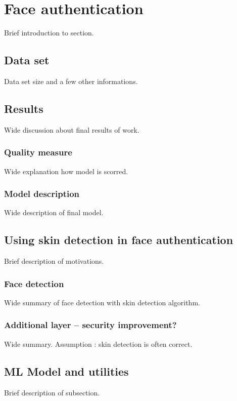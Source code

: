 \section{Face authentication}
    Brief introduction to section.

    \subsection{Data set}
        Data set size and a few other informations.

    \subsection{Results}
        Wide discussion about final results of work.

        \subsubsection*{Quality measure}   %
            Wide explanation how model is scorred.

        \subsubsection*{Model description} %
            Wide description of final model.

    \subsection{Using skin detection in face authentication}
            Brief description of motivations.

        \subsubsection*{Face detection}
            Wide summary of face detection with
            skin detection algorithm.

        \subsubsection*{Additional layer -- security improvement?}
            Wide summary.
            Assumption : skin detection is often correct.

    \subsection{ML Model and utilities}
        Brief description of subsection.
